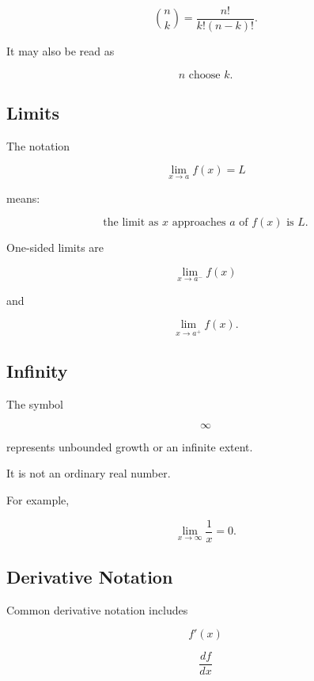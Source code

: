 \[
\boxed{
\binom{n}{k}
=
\frac{n!}{k!(n-k)!}.
}
\]

It may also be read as

\[
\boxed{
n\text{ choose }k.
}
\]

\subsection{Limits}
\label{subsec:limit-notation-reference}

The notation

\[
\boxed{
\lim_{x\to a}f(x)
=
L
}
\]

means:

\[
\boxed{
\text{the limit as }x\text{ approaches }a\text{ of }f(x)\text{ is }L.
}
\]

One-sided limits are

\[
\boxed{
\lim_{x\to a^-}f(x)
}
\]

and

\[
\boxed{
\lim_{x\to a^+}f(x).
}
\]

\subsection{Infinity}
\label{subsec:infinity-symbol-reference}

The symbol

\[
\boxed{
\infty
}
\]

represents unbounded growth or an infinite extent.

It is not an ordinary real number.

For example,

\[
\boxed{
\lim_{x\to\infty}\frac{1}{x}=0.
}
\]

\subsection{Derivative Notation}
\label{subsec:derivative-notation-reference}

Common derivative notation includes

\[
\boxed{
f'(x)
}
\]

\[
\boxed{
\frac{df}{dx}
}
\]

